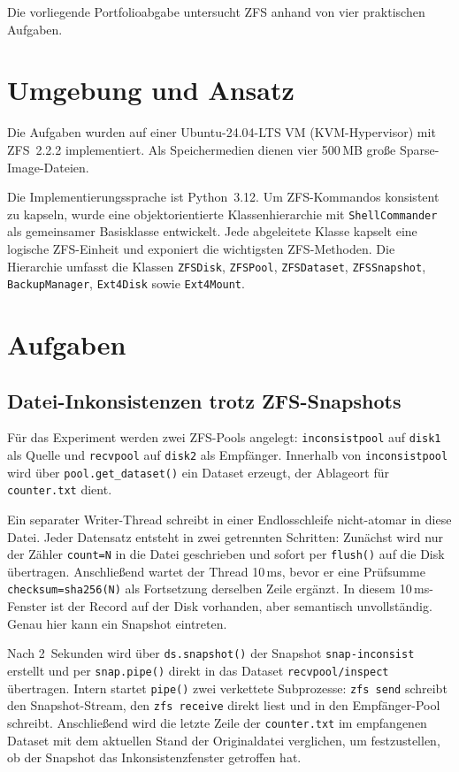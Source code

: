 \documentclass[a4paper, 12pt]{article}
\begin{document}
Die vorliegende Portfolioabgabe untersucht ZFS anhand von vier praktischen Aufgaben.

\section{Umgebung und Ansatz}

Die Aufgaben wurden auf einer Ubuntu-24.04-LTS VM (KVM-Hypervisor) mit ZFS~2.2.2 implementiert. Als Speichermedien dienen vier 500\,MB große Sparse-Image-Dateien.

Die Implementierungssprache ist Python~3.12. Um ZFS-Kommandos konsistent zu kapseln, wurde eine objektorientierte Klassenhierarchie mit \texttt{ShellCommander} als gemeinsamer Basisklasse entwickelt. Jede abgeleitete Klasse kapselt eine logische ZFS-Einheit und exponiert die wichtigsten ZFS-Methoden. Die Hierarchie umfasst die Klassen \texttt{ZFSDisk}, \texttt{ZFSPool}, \texttt{ZFSDataset}, \texttt{ZFSSnapshot}, \texttt{BackupManager}, \texttt{Ext4Disk} sowie \texttt{Ext4Mount}.

\section{Aufgaben}

\subsection{Datei-Inkonsistenzen trotz ZFS-Snapshots}

Für das Experiment werden zwei ZFS-Pools angelegt: \texttt{inconsistpool} auf \texttt{disk1} als Quelle und \texttt{recvpool} auf \texttt{disk2} als Empfänger. Innerhalb von \texttt{inconsistpool} wird über \texttt{pool.get\_dataset()} ein Dataset erzeugt, der Ablageort für \texttt{counter.txt} dient.

Ein separater Writer-Thread schreibt in einer Endlosschleife nicht-atomar in diese Datei. Jeder Datensatz entsteht in zwei getrennten Schritten: Zunächst wird nur der Zähler \texttt{count=N} in die Datei geschrieben und sofort per \texttt{flush()} auf die Disk übertragen. Anschließend wartet der Thread 10\,ms, bevor er eine Prüfsumme \texttt{checksum=sha256(N)} als Fortsetzung derselben Zeile ergänzt. In diesem 10\,ms-Fenster ist der Record auf der Disk vorhanden, aber semantisch unvollständig. Genau hier kann ein Snapshot eintreten.

Nach 2~Sekunden wird über \texttt{ds.snapshot()} der Snapshot \texttt{snap-inconsist} erstellt und per \texttt{snap.pipe()} direkt in das Dataset \texttt{recvpool/inspect} übertragen. Intern startet \texttt{pipe()} zwei verkettete Subprozesse: \texttt{zfs send} schreibt den Snapshot-Stream, den \texttt{zfs receive} direkt liest und in den Empfänger-Pool schreibt. Anschließend wird die letzte Zeile der \texttt{counter.txt} im empfangenen Dataset mit dem aktuellen Stand der Originaldatei verglichen, um festzustellen, ob der Snapshot das Inkonsistenzfenster getroffen hat.
\end{document}
